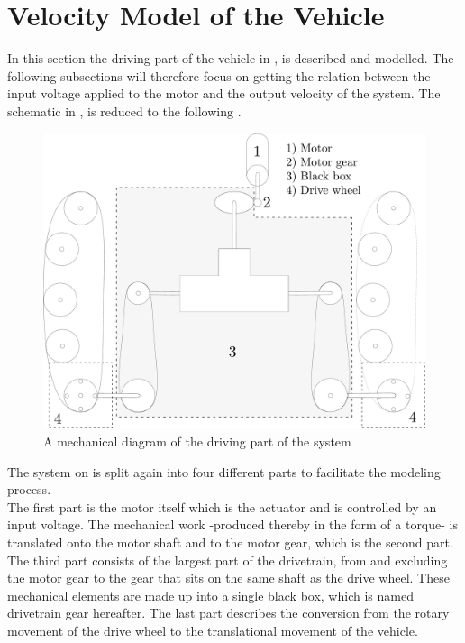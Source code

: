 \section{Velocity Model of the Vehicle}
In this section the driving part of the vehicle in ,  is described and modelled. The following subsections will therefore focus on getting the relation between the input voltage applied to the motor and the output velocity of the system. The schematic in ,  is reduced to the following .

\begin{figure}[H]
	\centering
	\includegraphics[scale=0.2]{figures/vehicleDescriptionDriveTrainBlackBox.pdf}
	\caption{A mechanical diagram of the driving part of the system}
	\label{fig:vehicleDescriptionDriveTrainBlackBox}
\end{figure}

The system on  is split again into four different parts to facilitate the modeling process.\\
The first part is the motor itself which is the actuator and is controlled by an input voltage. The mechanical work -produced thereby in the form of a torque- is translated onto the motor shaft and to the motor gear, which is the second part.
The third part consists of the largest part of the drivetrain, from and excluding the motor gear to the gear that sits on the same shaft as the drive wheel. These mechanical elements are made up into a single black box, which is named drivetrain gear hereafter.
The last part describes the conversion from the rotary movement of the drive wheel to the translational movement of the vehicle.

